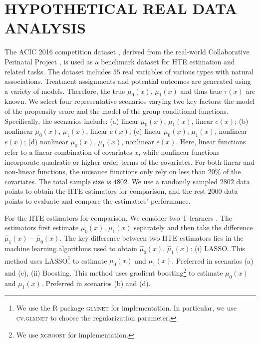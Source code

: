 \documentclass[twoside]{article}
\newcommand{\1}{{\mathbbm{1}}}
\begin{document}
\section{HYPOTHETICAL REAL DATA ANALYSIS}\label{sec:simulation}

The ACIC 2016 competition dataset \parencite{dorie2019automated}, derived from the real-world Collaborative Perinatal Project \parencite{niswander1972women}, is used as a benchmark dataset for HTE estimation and related tasks. 
The dataset includes $55$ real variables of various types with natural associations. 
Treatment assignments and potential outcomes are generated using a variety of models. 
Therefore, the true $\mu_0(x)$, $\mu_1(x)$ and thus true $\tau(x)$ are known.
We select four representative scenarios varying two key factors: the model of the propensity score and the model of the group conditional functions. 
Specifically, the scenarios include: (a) linear $\mu_0(x)$, $\mu_1(x)$, linear $e(x)$; (b) nonlinear $\mu_0(x)$, $\mu_1(x)$, linear $e(x)$; (c) linear $\mu_0(x)$, $\mu_1(x)$, nonlinear $e(x)$; (d) nonlinear $\mu_0(x)$, $\mu_1(x)$, nonlinear $e(x)$.
Here, linear functions refer to a linear combination of covariates $x$, while nonlinear functions incorporate quadratic or higher-order terms of the covariates. 
For both linear and non-linear functions, the nuisance functions only rely on less than $20\%$ of the covariates.
The total sample size is $4802$. We use a randomly sampled $2802$ data points to obtain the HTE estimators for comparison, and the rest $2000$ data points to evaluate and compare the estimators' performance.


For the HTE estimators for comparison, We consider two T-learners \parencite{Kunzel4156}.
The estimators first estimate $\mu_0(x)$, $\mu_1(x)$ separately and then take the difference $\hat{\mu}_1(x) - \hat{\mu}_0(x)$.
The key difference between two HTE estimators lies in the machine learning algorithms used to obtain $\hat{\mu}_0(x)$, $\hat{\mu}_1(x)$: (i) LASSO. This method uses LASSO\footnote{We use the R package \textsc{glmnet} for implementation. In particular, we use \textsc{cv.glmnet} to choose the regularization parameter.} to estimate $\mu_0(x)$ and $\mu_1(x)$. Preferred in scenarios (a) and (c), (ii) Boosting. This method uses gradient boosting\footnote{We use \textsc{xgboost} for implementation.} to estimate $\mu_0(x)$ and $\mu_1(x)$. Preferred in scenarios (b) and (d).
\end{document}
